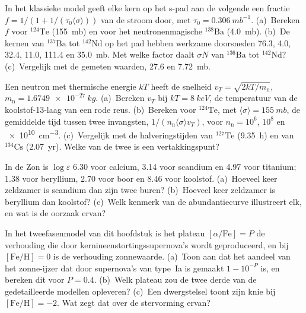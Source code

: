 \begin{exercise}[$\star\star$]\label{exo:b3:origin-of-elements:6}
In het klassieke model geeft elke kern op het s-pad aan de volgende
een fractie $f = 1/(1 + 1/(\tau_0\langle\sigma\rangle))$ van de
stroom door, met $\tau_0 = \qty{0.306}{mb^{-1}}$. (a)~Bereken $f$ voor
$^{124}\mathrm{Te}$ (\qty{155}{mb}) en voor het neutronenmagische
$^{138}\mathrm{Ba}$ (\qty{4.0}{mb}). (b)~De kernen van
$^{137}\mathrm{Ba}$ tot $^{142}\mathrm{Nd}$ op het pad hebben
werkzame doorsneden \num{76.3}, \num{4.0}, \num{32.4}, \num{11.0},
\num{111.4} en \qty{35.0}{mb}. Met welke factor daalt $\sigma N$ van
$^{136}\mathrm{Ba}$ tot $^{142}\mathrm{Nd}$? (c)~Vergelijk met de
gemeten waarden, \num{27.6} en \qty{7.72}{mb}.
\end{exercise}

\begin{exercise}[$\star\star$]\label{exo:b3:origin-of-elements:7}
Een neutron met thermische energie $kT$ heeft de snelheid
$v_T = \sqrt{2kT/m_\mathrm{n}}$, $m_\mathrm{n} = \qty{1.6749e-27}{kg}$.
(a)~Bereken $v_T$ bij $kT = \qty{8}{keV}$, de temperatuur van de
koolstof-13-laag van een rode reus. (b)~Bereken voor $^{124}\mathrm{Te}$,
met $\langle\sigma\rangle = \qty{155}{mb}$, de gemiddelde tijd tussen
twee invangsten, $1/(n_\mathrm{n}\langle\sigma\rangle v_T)$, voor
$n_\mathrm{n} = 10^6$, $10^8$ en \qty{e10}{cm^{-3}}. (c)~Vergelijk met de
halveringstijden van $^{127}\mathrm{Te}$ (\qty{9.35}{h}) en van
$^{134}\mathrm{Cs}$ (\qty{2.07}{yr}). Welke van de twee is een vertakkingspunt?
\end{exercise}

\begin{exercise}[$\star\star$]\label{exo:b3:origin-of-elements:8}
In de Zon is $\log\varepsilon$ \num{6.30} voor calcium, \num{3.14} voor
scandium en \num{4.97} voor titanium; \num{1.38} voor beryllium,
\num{2.70} voor boor en \num{8.46} voor koolstof. (a)~Hoeveel keer
zeldzamer is scandium dan zijn twee buren? (b)~Hoeveel keer zeldzamer is
beryllium dan koolstof? (c)~Welk kenmerk van de abundantiecurve illustreert
elk, en wat is de oorzaak ervan?
\end{exercise}

\begin{exercise}[$\star\star$]\label{exo:b3:origin-of-elements:9}
In het tweefasenmodel van dit hoofdstuk is het plateau
$[\alpha/\mathrm{Fe}] = P$ de verhouding die door kernineenstortingssupernova's
wordt geproduceerd, en bij $[\mathrm{Fe/H}] = 0$ is de verhouding zonnewaarde. (a)~Toon aan dat het aandeel
van het zonne-ijzer dat door supernova's van type~Ia is gemaakt $1 - 10^{-P}$ is, en
bereken dit voor $P = 0.4$. (b)~Welk plateau zou de twee derde van de
gedetailleerde modellen opleveren? (c)~Een dwergstelsel toont zijn knie
bij $[\mathrm{Fe/H}] = -2$. Wat zegt dat over de stervorming ervan?
\end{exercise}

